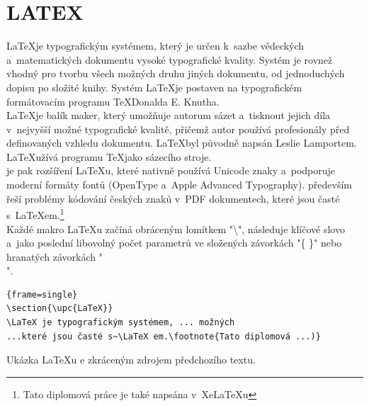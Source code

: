 \documentclass[a4paper,12pt,twoside,BCOR=10mm]{article}
\newcommand{\upc}[1]{\uppercase{#1}} %
\newenvironment{codeframe}{%
  \begin{Sbox} 
    \begin{minipage} 
      {\columnwidth-\leftmargin-\rightmargin-2\fboxsep-2\fboxrule-4pt} 
}{%

  \end{minipage} 
  \end{Sbox} 
  \begin{center} 
    \fcolorbox{black}{codeback}{\TheSbox} 
  \end{center} 
}
\begin{document}
\section{\upc{LaTeX}}
\LaTeX je typografickým systémem, který je určen k~sazbe vědeckých a~matematických dokumentu vysoké typografické kvality. Systém je rovnež vhodný pro tvorbu všech možných druhu jiných dokumentu, od jednoduchých dopisu po složité knihy. Systém \LaTeX je postaven na typografickém formátovacím programu \TeX Donalda E. Knutha.\\
\LaTeX je balík maker, který umožňuje autorum sázet a~tisknout jejich díla v~nejvyšší možné typografické kvalitě, přičemž autor používá profesionály před definovaných vzhledu dokumentu. \LaTeX byl původně napsán Leslie Lamportem. \LaTeX užívá programu \TeX jako sázecího stroje.\\
\XeLaTeX je pak rozšíření \LaTeX u, které nativně používá Unicode znaky a~podporuje moderní formáty fontů (OpenType a~Apple Advanced Typography). \XeLaTeX především řeší problémy kódování českých znaků v~PDF dokumentech, které jsou časté s~\LaTeX em.\footnote{Tato diplomová práce je také napsána v~XeLaTeXu}\\

Každé makro \LaTeX u začíná obráceným lomítkem "\textbackslash", následuje klíčové slovo a~jako poslední libovolný počet parametrů ve složených závorkách "\{ \}" nebo hranatých závorkách "\[ \]".
    \begin{codeframe}
      \begin{Verbatim}{frame=single}
\section{\upc{LaTeX}}
\LaTeX je typografickým systémem, ... možných
...které jsou časté s~\LaTeX em.\footnote{Tato diplomová ...)}
\end{Verbatim} 
    \end{codeframe}
Ukázka \LaTeX u e zkráceným zdrojem předchozího textu.

%
%
%


\end{document}
